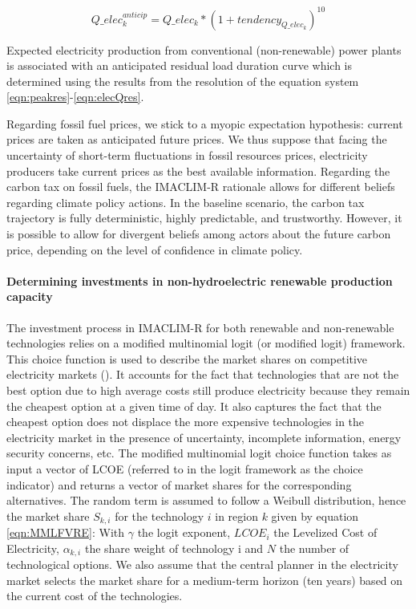 \begin{dmath}
    Q\_elec_k^{anticip} = Q\_elec_k * \left( 1 + tendency_{Q\_elec_k}\right) ^{10}
    \label{eqn:elecQAnticip}
\end{dmath}

Expected electricity production from conventional (non-renewable) power plants is associated with an anticipated residual load duration curve which is determined using the results from the resolution of the equation system \ref{eqn:peakres}-\ref{eqn:elecQres}.

Regarding fossil fuel prices, we stick to a myopic expectation hypothesis: current prices are taken as anticipated future prices. We thus suppose that facing the uncertainty of short-term fluctuations in fossil resources prices, electricity producers take current prices as the best available information. 
Regarding the carbon tax on fossil fuels, the IMACLIM-R rationale allows for different beliefs regarding climate policy actions. In the baseline scenario, the carbon tax trajectory is fully deterministic, highly predictable, and trustworthy. However, it is possible to allow for divergent beliefs among actors about the future carbon price, depending on the level of confidence in climate policy.

\paragraph{Determining investments in non-hydroelectric renewable production capacity}

The investment process in IMACLIM-R for both renewable and non-renewable technologies relies on a modified multinomial logit (or modified logit) framework. This choice function is used to describe the market shares on competitive electricity markets (\cite{Clarke1993}). It accounts for the fact that technologies that are not the best option due to high average costs still produce electricity because they remain the cheapest option at a given time of day. It also captures the fact that the cheapest option does not displace the more expensive technologies in the electricity market in the presence of uncertainty, incomplete information, energy security concerns, etc. 
The modified multinomial logit choice function takes as input a vector of LCOE (referred to in the logit framework as the choice indicator) and returns a vector of market shares for the corresponding alternatives.  The random term is assumed to follow a Weibull distribution, hence the market share $S_{k,i}$ for the technology $i$ in region $k$ given by equation \ref{eqn:MMLFVRE}:
With $\gamma$ the logit exponent, $LCOE_{i}$ the Levelized Cost of Electricity, $\alpha_{k,i}$ the share weight of technology i and $N$ the number of technological options.
We also assume that the central planner in the electricity market selects the market share for a medium-term horizon (ten years) based on the current cost of the technologies.


